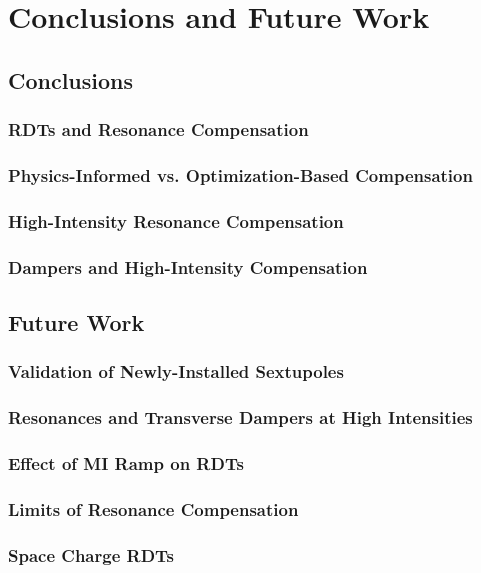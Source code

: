 \chapter{Conclusions and Future Work}
\label{sec:ch7}

\section{Conclusions}

\subsection{RDTs and Resonance Compensation}

\subsection{Physics-Informed vs. Optimization-Based Compensation}

\subsection{High-Intensity Resonance Compensation}

\subsection{Dampers and High-Intensity Compensation}

\section{Future Work}

\subsection{Validation of Newly-Installed Sextupoles}

\subsection{Resonances and Transverse Dampers at High Intensities}

\subsection{Effect of MI Ramp on RDTs}

\subsection{Limits of Resonance Compensation}

\subsection{Space Charge RDTs}
\cite{cris1} \cite{cris2}
